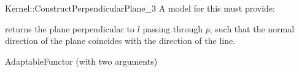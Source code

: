 \begin{ccRefFunctionObjectConcept}{Kernel::ConstructPerpendicularPlane_3}
A model for this must provide:


{returns the plane perpendicular to $l$ passing through $p$,
such that the normal direction of the plane coincides with the direction of
the line.}

\ccRefines
AdaptableFunctor (with two arguments)

\ccSeeAlso
{} \\

\end{ccRefFunctionObjectConcept}
